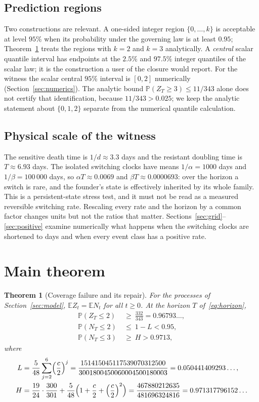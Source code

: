 \documentclass[11pt,a4paper]{article}
\theoremstyle{plain}
\newtheorem{theorem}{Theorem}[section]
\theoremstyle{definition}
\theoremstyle{remark}
\newcommand{\PP}{\mathbb P}
\newcommand{\EE}{\mathbb E}
\begin{document}
\subsection{Prediction regions}
Two constructions are relevant. A one-sided integer region $\{0,\dots,k\}$ is acceptable at level $95\%$ when its probability under the governing law is at least $0.95$; Theorem~\ref{thm:main} treats the regions with $k=2$ and $k=3$ analytically. A \emph{central} scalar quantile interval has endpoints at the $2.5\%$ and $97.5\%$ integer quantiles of the scalar law; it is the construction a user of the closure would report. For the witness the scalar central $95\%$ interval is $[0,2]$ numerically (Section~\ref{sec:numerics}). The analytic bound $\PP(Z_T\ge3)\le 11/343$ alone does not certify that identification, because $11/343>0.025$; we keep the analytic statement about $\{0,1,2\}$ separate from the numerical quantile calculation.

\subsection{Physical scale of the witness}
The sensitive death time is $1/d\approx3.3$ days and the resistant doubling time is $T\approx6.93$ days. The isolated switching clocks have means $1/\alpha=1000$ days and $1/\beta=100\,000$ days, so $\alpha T\approx0.0069$ and $\beta T\approx0.0000693$: over the horizon a switch is rare, and the founder's state is effectively inherited by its whole family. This is a persistent-state stress test, and it must not be read as a measured reversible switching rate. Rescaling every rate and the horizon by a common factor changes units but not the ratios that matter. Sections~\ref{sec:grid}--\ref{sec:positive} examine numerically what happens when the switching clocks are shortened to days and when every event class has a positive rate.

\section{Main theorem}\label{sec:main}

\begin{theorem}[Coverage failure and its repair]\label{thm:main}
For the processes of Section~\ref{sec:model}, $\EE Z_t=\EE N_t$ for all $t\ge0$. At the horizon $T$ of~\eqref{eq:horizon},
\begin{align}
\PP(Z_T\le2)&\ \ge\ \frac{332}{343}=0.96793\ldots,\label{eq:scalarclaim}\\
\PP(N_T\le2)&\ \le\ 1-L<0.95,\label{eq:trueclaim}\\
\PP(N_T\le3)&\ \ge\ H>0.9713,\label{eq:repairclaim}
\end{align}
where
\begin{align}
L&=\frac5{48}\sum_{j=2}^{6}\Bigl(\frac c2\Bigr)^{j}
=\frac{151415045117539070312500}{3001800450060004500180003}=0.050441409293\ldots,\label{eq:L}\\
H&=\frac{19}{24}\cdot\frac{300}{301}+\frac5{48}\Bigl(1+\frac c2+\Bigl(\frac c2\Bigr)^2\Bigr)
=\frac{467880212635}{481696324816}=0.971317796152\ldots\label{eq:H}
\end{align}
\end{theorem}
\end{document}
